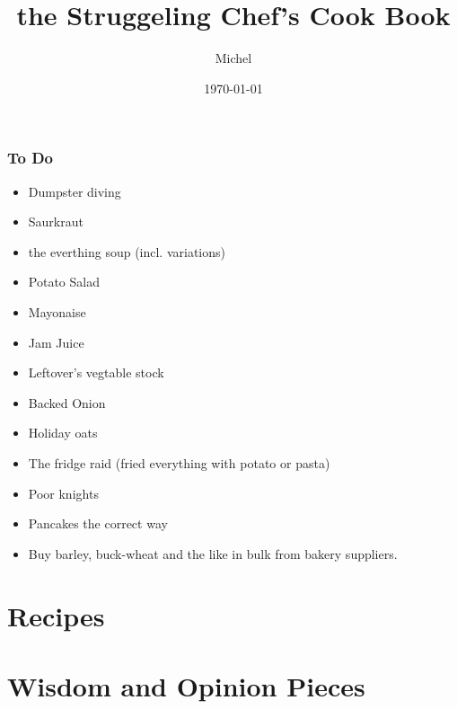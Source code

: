 \documentclass[10pt]{article}
\title{\sc the Struggeling Chef's Cook Book}
\author{Michel}
\date{\today}
\begin{document}
\maketitle

\tableofcontents

\section*{To Do}{
  \begin{itemize}
    \item Dumpster diving
    \item Saurkraut
    \item the everthing soup (incl. variations)
    \item Potato Salad
    \item Mayonaise
    \item Jam Juice
    \item Leftover's vegtable stock
    \item Backed Onion
    \item Holiday oats
    \item The fridge raid (fried everything with potato or pasta)
    \item Poor knights
    \item Pancakes the correct way
    \item Buy barley, buck-wheat and the like in bulk from bakery suppliers.
  \end{itemize}

}

\clearpage
\part{\sc Recipes}
\begingroup
\let\clearpage\relax
\let\newpage\relax
\begin{multicols}{2}


\end{multicols}
\endgroup

\clearpage
{}
\part{\sc Wisdom and Opinion Pieces}

\end{document}

